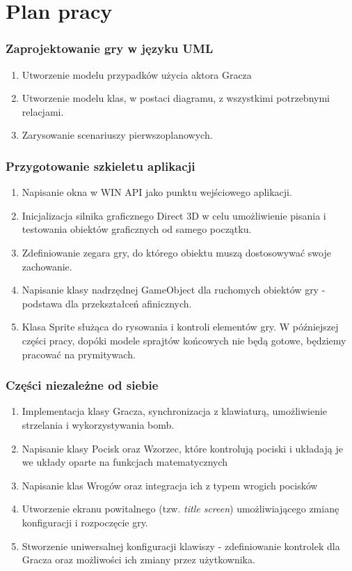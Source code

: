 \documentclass[a4paper,twoside]{article}
\begin{document}
	\newpage
	
	\part{Plan pracy}
	\section{Zaprojektowanie gry w języku UML}
	\begin{enumerate}[label=\alph*.]
		\item Utworzenie modelu przypadków użycia aktora Gracza
		\item Utworzenie modelu klas, w postaci diagramu, z wszystkimi potrzebnymi relacjami.
		\item Zarysowanie scenariuszy pierwszoplanowych.
	\end{enumerate}
	\section{Przygotowanie szkieletu aplikacji}
	\begin{enumerate}[label=\alph*.]
		\item Napisanie okna w WIN API jako punktu wejściowego aplikacji.
		\item Inicjalizacja silnika graficznego Direct 3D w celu umożliwienie pisania i testowania obiektów graficznych od samego początku.
		\item Zdefiniowanie zegara gry, do którego obiektu muszą dostosowywać swoje zachowanie.
		\item Napisanie klasy nadrzędnej GameObject dla ruchomych obiektów gry - podstawa dla przekształceń afinicznych.
		\item Klasa Sprite służąca do rysowania i kontroli elementów gry. W późniejszej części pracy, dopóki modele sprajtów końcowych nie będą gotowe, będziemy pracować na prymitywach.
	\end{enumerate}
	\section{Części niezależne od siebie}
	\begin{enumerate}[label=\alph*.]
		\item Implementacja klasy Gracza, synchronizacja z klawiaturą, umożliwienie strzelania i wykorzystywania bomb.
		\item Napisanie klasy Pocisk oraz Wzorzec, które kontrolują pociski i układają je we układy oparte na funkcjach matematycznych
		\item Napisanie klas Wrogów oraz integracja ich z typem wrogich pocisków
		\item Utworzenie ekranu powitalnego (tzw. \emph{title screen}) umożliwiającego zmianę konfiguracji i rozpoczęcie gry.
		\item Stworzenie uniwersalnej konfiguracji klawiszy - zdefiniowanie kontrolek dla Gracza oraz możliwości ich zmiany przez użytkownika.
	\end{enumerate}
\end{document}
